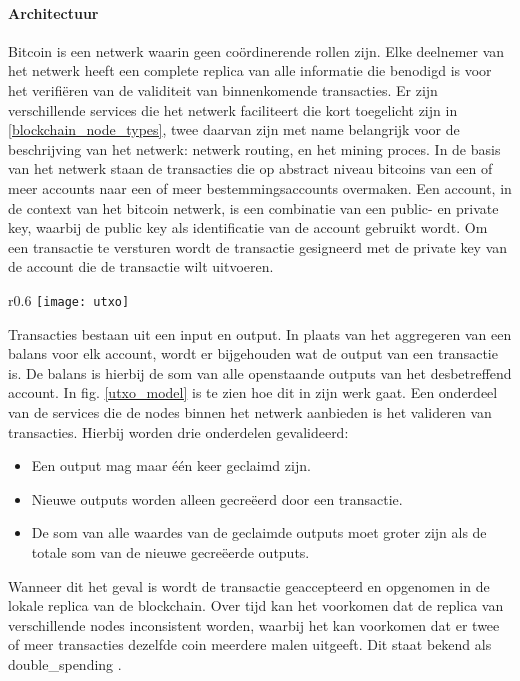 \paragraph{Architectuur}
Bitcoin is een netwerk waarin geen coördinerende rollen zijn. Elke deelnemer van het netwerk heeft een complete replica van alle informatie die benodigd is voor het verifiëren van de validiteit van binnenkomende transacties. Er zijn verschillende services die het netwerk faciliteert die kort toegelicht zijn in \ref{blockchain_node_types}, twee daarvan zijn met name belangrijk voor de beschrijving van het netwerk: netwerk routing, en het mining proces. In de basis van het netwerk staan de transacties die op abstract niveau bitcoins van een of meer accounts naar een of meer bestemmingsaccounts overmaken. Een \gls{account}, in de context van het bitcoin netwerk, is een combinatie van een public- en private key, waarbij de public key als identificatie van de \gls{account} gebruikt wordt. Om een transactie te versturen wordt de transactie gesigneerd met de private key van de \gls{account} die de transactie wilt uitvoeren. 
\begin{wrapfigure}{r}{0.6\textwidth}
  \texttt{[image: utxo]}
  \caption{Voorbeeld van het UTXO-model zoals in gebruik bij Bitcoin, bron: http://news.8btc.com/thoughts-on-bytom-design-extension-of-utxo-structure.}
  \label{utxo_model}
\end{wrapfigure}

Transacties bestaan uit een input en output. In plaats van het aggregeren van een balans voor elk \gls{account}, wordt er bijgehouden wat de output van een transactie is. De balans is hierbij de som van alle openstaande outputs van het desbetreffend \gls{account}. In fig. \ref{utxo_model} is te zien hoe dit in zijn werk gaat. Een onderdeel van de services die de \glspl{node} binnen het netwerk aanbieden is het valideren van transacties. Hierbij worden drie onderdelen gevalideerd:

\begin{itemize}

  \item Een output mag maar één keer geclaimd zijn.
  \item Nieuwe outputs worden alleen gecreëerd door een transactie.
  \item De som van alle waardes van de geclaimde outputs moet groter zijn als de totale som van de nieuwe gecreëerde outputs.
\end{itemize}

Wanneer dit het geval is wordt de transactie geaccepteerd en opgenomen in de lokale replica van de blockchain. Over tijd kan het voorkomen dat de replica van verschillende \glspl{node} inconsistent worden, waarbij het kan voorkomen dat er twee of meer transacties dezelfde coin meerdere malen uitgeeft. Dit staat bekend als \gls{double_spending} \citep{6688704}.

